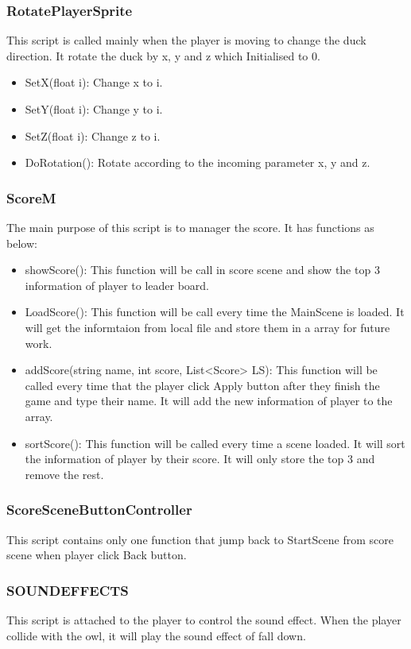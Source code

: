 \documentclass[12pt]{article}
\begin{document}
\subsubsection{RotatePlayerSprite}
This script is called mainly when the player is moving to change the duck direction. It rotate the duck by x, y and z which Initialised to 0.
\begin{itemize}
\item SetX(float i): Change x to i.
\item SetY(float i): Change y to i.
\item SetZ(float i): Change z to i.
\item DoRotation(): Rotate according to the incoming parameter x, y and z.
\end{itemize}

\subsubsection{ScoreM}
The main purpose of this script is to manager the score. It has functions as below:
\begin{itemize}
\item showScore(): This function will be call in score scene and show the top 3 information of player to leader board.
\item LoadScore(): This function will be call every time the MainScene is loaded. It will get the informtaion from local file and store them in a array for future work.
\item addScore(string name, int score, List<Score> LS): This function will be called every time that the player click Apply button after they finish the game and type their name. It will add the new information of player to the array.
\item sortScore(): This function will be called every time a scene loaded. It will sort the information of player by their score. It will only store the top 3 and remove the rest.
\end{itemize}

\subsubsection{ScoreSceneButtonController}
This script contains only one function that jump back to StartScene from score scene when player click Back button. 

\subsubsection{SOUNDEFFECTS}
This script is attached to the player to control the sound effect. When the player collide with the owl, it will play the sound effect of fall down.
\end{document}
